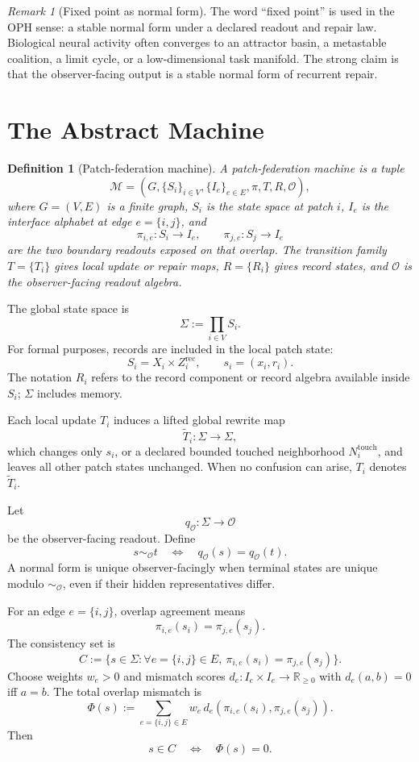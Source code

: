 \documentclass[11pt]{article}
\newtheorem{definition}[theorem]{Definition}
\theoremstyle{remark}
\newtheorem{remark}[theorem]{Remark}
\theoremstyle{plain}
\newcommand{\R}{\mathbb R}
\newcommand{\rec}{\mathrm{rec}}
\begin{document}
\begin{remark}[Fixed point as normal form]
The word ``fixed point'' is used in the OPH sense: a stable normal form under a declared readout and repair law. Biological neural activity often converges to an attractor basin, a metastable coalition, a limit cycle, or a low-dimensional task manifold. The strong claim is that the observer-facing output is a stable normal form of recurrent repair.
\end{remark}

\section{The Abstract Machine}

\begin{definition}[Patch-federation machine]
A patch-federation machine is a tuple
\[
\mathcal M=(G,\{S_i\}_{i\in V},\{I_e\}_{e\in E},\pi,T,R,\mathcal O),
\]
where \(G=(V,E)\) is a finite graph, \(S_i\) is the state space at patch \(i\), \(I_e\) is the interface alphabet at edge \(e=\{i,j\}\), and
\[
\pi_{i,e}:S_i\to I_e,\qquad \pi_{j,e}:S_j\to I_e
\]
are the two boundary readouts exposed on that overlap. The transition family \(T=\{T_i\}\) gives local update or repair maps, \(R=\{R_i\}\) gives record states, and \(\mathcal O\) is the observer-facing readout algebra.
\end{definition}

The global state space is
\[
\Sigma:=\prod_{i\in V}S_i.
\]
For formal purposes, records are included in the local patch state:
\[
S_i=X_i\times Z_i^{\rec},
\qquad
s_i=(x_i,r_i).
\]
The notation \(R_i\) refers to the record component or record algebra available inside \(S_i\); \(\Sigma\) includes memory.

Each local update \(T_i\) induces a lifted global rewrite map
\[
\widetilde T_i:\Sigma\to\Sigma,
\]
which changes only \(s_i\), or a declared bounded touched neighborhood \(N_i^{\mathrm{touch}}\), and leaves all other patch states unchanged. When no confusion can arise, \(T_i\) denotes \(\widetilde T_i\).

Let
\[
q_{\mathcal O}:\Sigma\to\mathcal O
\]
be the observer-facing readout. Define
\[
s\sim_{\mathcal O}t
\quad\Longleftrightarrow\quad
q_{\mathcal O}(s)=q_{\mathcal O}(t).
\]
A normal form is unique observer-facingly when terminal states are unique modulo \(\sim_{\mathcal O}\), even if their hidden representatives differ.

For an edge \(e=\{i,j\}\), overlap agreement means
\[
\pi_{i,e}(s_i)=\pi_{j,e}(s_j).
\]
The consistency set is
\[
C:=\bigl\{s\in\Sigma:\forall e=\{i,j\}\in E,\ 
\pi_{i,e}(s_i)=\pi_{j,e}(s_j)\bigr\}.
\]
Choose weights \(w_e>0\) and mismatch scores \(d_e:I_e\times I_e\to\R_{\ge 0}\) with \(d_e(a,b)=0\) iff \(a=b\). The total overlap mismatch is
\[
\Phi(s)
:=
\sum_{e=\{i,j\}\in E}
w_e\,d_e\!\left(\pi_{i,e}(s_i),\pi_{j,e}(s_j)\right).
\]
Then
\[
s\in C\quad\Longleftrightarrow\quad \Phi(s)=0.
\]
\end{document}
